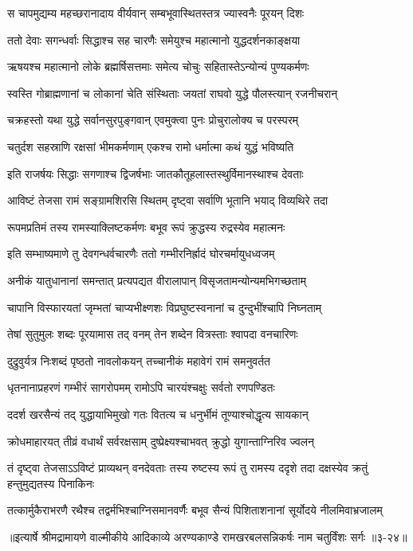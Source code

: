 \twolineshloka
{स चापमुद्यम्य महच्छरानादाय वीर्यवान्}
{सम्बभूवास्थितस्तत्र ज्यास्वनैः पूरयन् दिशः} %

\twolineshloka
{ततो देवाः सगन्धर्वाः सिद्धाश्च सह चारणैः}
{समेयुश्च महात्मानो युद्धदर्शनकाङ्क्षया} %

\twolineshloka
{ऋषयश्च महात्मानो लोके ब्रह्मर्षिसत्तमाः}
{समेत्य चोचुः सहितास्तेऽन्योन्यं पुण्यकर्मणः} %

\twolineshloka
{स्वस्ति गोब्राह्मणानां च लोकानां चेति संस्थिताः}
{जयतां राघवो युद्धे पौलस्त्यान् रजनीचरान्} %

\twolineshloka
{चक्रहस्तो यथा युद्धे सर्वानसुरपुङ्गवान्}
{एवमुक्त्वा पुनः प्रोचुरालोक्य च परस्परम्} %

\twolineshloka
{चतुर्दश सहस्राणि रक्षसां भीमकर्मणाम्}
{एकश्च रामो धर्मात्मा कथं युद्धं भविष्यति} %

\twolineshloka
{इति राजर्षयः सिद्धाः सगणाश्च द्विजर्षभाः}
{जातकौतूहलास्तस्थुर्विमानस्थाश्च देवताः} %

\twolineshloka
{आविष्टं तेजसा रामं सङ्ग्रामशिरसि स्थितम्}
{दृष्ट्वा सर्वाणि भूतानि भयाद् विव्यथिरे तदा} %

\twolineshloka
{रूपमप्रतिमं तस्य रामस्याक्लिष्टकर्मणः}
{बभूव रूपं क्रुद्धस्य रुद्रस्येव महात्मनः} %

\twolineshloka
{इति सम्भाष्यमाणे तु देवगन्धर्वचारणैः}
{ततो गम्भीरनिर्ह्रादं घोरचर्मायुधध्वजम्} %

\twolineshloka
{अनीकं यातुधानानां समन्तात् प्रत्यपद्यत}
{वीरालापान् विसृजतामन्योन्यमभिगच्छताम्} %

\twolineshloka
{चापानि विस्फारयतां जृम्भतां चाप्यभीक्ष्णशः}
{विप्रघुष्टस्वनानां च दुन्दुभींश्चापि निघ्नताम्} %

\twolineshloka
{तेषां सुतुमुलः शब्दः पूरयामास तद् वनम्}
{तेन शब्देन वित्रस्ताः श्वापदा वनचारिणः} %

\twolineshloka
{दुद्रुवुर्यत्र निःशब्दं पृष्ठतो नावलोकयन्}
{तच्चानीकं महावेगं रामं समनुवर्तत} %

\twolineshloka
{धृतनानाप्रहरणं गम्भीरं सागरोपमम्}
{रामोऽपि चारयंश्चक्षुः सर्वतो रणपण्डितः} %

\twolineshloka
{ददर्श खरसैन्यं तद् युद्धायाभिमुखो गतः}
{वितत्य च धनुर्भीमं तूण्याश्चोद्धृत्य सायकान्} %

\twolineshloka
{क्रोधमाहारयत् तीव्रं वधार्थं सर्वरक्षसाम्}
{दुष्प्रेक्ष्यश्चाभवत् क्रुद्धो युगान्ताग्निरिव ज्वलन्} %

\threelineshloka
{तं दृष्ट्वा तेजसाऽऽविष्टं प्राव्यथन् वनदेवताः}
{तस्य रुष्टस्य रूपं तु रामस्य ददृशे तदा}
{दक्षस्येव क्रतुं हन्तुमुद्यतस्य पिनाकिनः} %

\twolineshloka
{तत्कार्मुकैराभरणै रथैश्च तद्वर्मभिश्चाग्निसमानवर्णैः}
{बभूव सैन्यं पिशिताशनानां सूर्योदये नीलमिवाभ्रजालम्} %


॥इत्यार्षे श्रीमद्रामायणे वाल्मीकीये आदिकाव्ये अरण्यकाण्डे रामखरबलसन्निकर्षः नाम चतुर्विंशः सर्गः ॥३-२४॥
